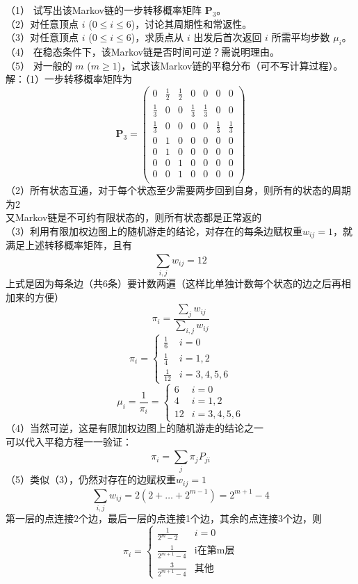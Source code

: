 \documentclass[UTF8,openany]{book}
\begin{document}
\noindent （1） 试写出该Markov链的一步转移概率矩阵 \( \bm{P}_3 \)。\\
（2）对任意顶点 \( i \) (\( 0 \leq i \leq 6 \))，讨论其周期性和常返性。\\
（3）对任意顶点 \( i \) (\( 0 \leq i \leq 6 \))，求质点从 \( i \) 出发后首次返回 \( i \) 所需平均步数 \( \mu_i \)。\\
（4） 在稳态条件下，该Markov链是否时间可逆？需说明理由。\\
（5） 对一般的 \( m \) (\( m \geq 1 \))，试求该Markov链的平稳分布（可不写计算过程）。\\
解：（1）一步转移概率矩阵为
\[
\bm{P}_3=
\begin{pmatrix}
	0 & \frac{1}{2} &\frac{1}{2} & 0 &0 &0&0\\
	\frac{1}{3} & 0&0 & \frac{1}{3} &\frac{1}{3} &0&0\\
	\frac{1}{3} & 0&0 & 0 &0 &\frac{1}{3}&\frac{1}{3}\\
	0 & 1 &0 & 0 &0 &0&0\\
	0 & 1 &0 & 0 &0 &0&0\\
	0 & 0&1 & 0 &0 &0&0\\
	0 & 0&1 & 0 &0 &0&0\\
\end{pmatrix}
\]
（2）所有状态互通，对于每个状态至少需要两步回到自身，则所有的状态的周期为2\\
又Markov链是不可约有限状态的，则所有状态都是正常返的\\
（3）利用有限加权边图上的随机游走的结论，对存在的每条边赋权重$w_{ij}=1$，就满足上述转移概率矩阵，且有\\
\[
\sum\limits_{i,j}^{} w_{ij}=12
\]
上式是因为每条边（共6条）要计数两遍（这样比单独计数每个状态的边之后再相加来的方便）\\
\[
\pi_i=\frac{\sum\limits_{j}^{} w_{ij}}{\sum\limits_{i,j}^{} w_{ij}}
\]
\[
\pi_i=
\begin{cases}
	\frac{1}{6}  &  i=0 \\
	\frac{1}{4} &  i=1,2\\
	\frac{1}{12} & i=3,4,5,6
\end{cases}
\]
\[
\mu_i=\frac{1}{\pi_i}=
\begin{cases}
	6  &  i=0 \\
	4 &  i=1,2\\
	12 & i=3,4,5,6
\end{cases}
\]
（4）当然可逆，这是有限加权边图上的随机游走的结论之一\\
可以代入平稳方程一一验证：\\
\[
\pi_i=\sum\limits_{j}^{} \pi_j P_{ji}
\]
（5）类似（3），仍然对存在的边赋权重$w_{ij}=1$\\
\[
\sum\limits_{i,j}^{} w_{ij}=2(2+\dots+2^{m-1})=2^{m+1}-4
\]
第一层的点连接2个边，最后一层的点连接1个边，其余的点连接3个边，则\\
\[
\pi_i=
\begin{cases}
	\frac{1}{2^m-2}  &  i=0 \\
	\frac{1}{2^{m+1}-4} &  \text{i在第m层}\\
	\frac{3}{2^{m+1}-4} & \text{其他}
\end{cases}
\]\\
\end{document}
